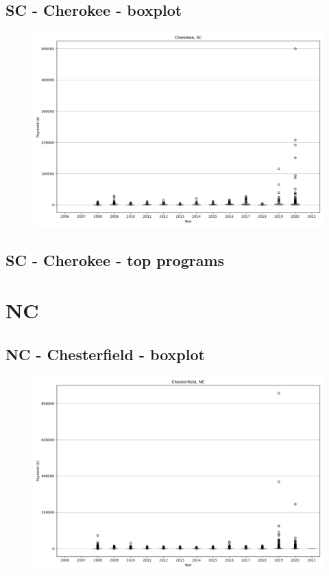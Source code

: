 \subsection*{SC - Cherokee - boxplot}
\begin{figure}[h]
\centering
\includegraphics[width=7in]{../output/boxplots/counties/Cherokee-SC_boxplot.png}
\end{figure}


\subsection*{SC - Cherokee - top programs}

\newpage
\section*{NC}
\subsection*{NC - Chesterfield - boxplot}
\begin{figure}[h]
\centering
\includegraphics[width=7in]{../output/boxplots/counties/Chesterfield-NC_boxplot.png}
\end{figure}


